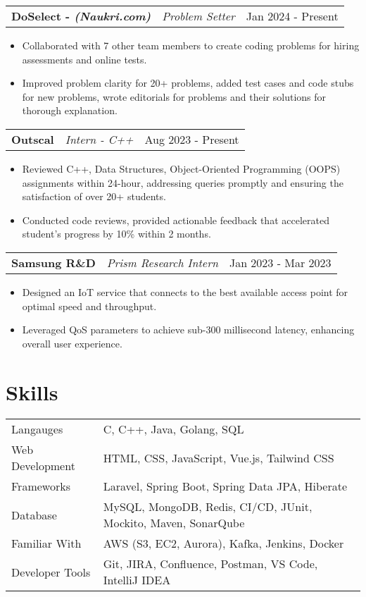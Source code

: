 \documentclass[a4paper,10pt]{article}
\makeatletter
\newenvironment{joblong}[3]
    {
    \begin{tabularx}{\linewidth}{@{}l X r@{}}
    \textbf{#1} & \textit{#2} &  #3 \\[3pt]
    \end{tabularx}
    \begin{minipage}[t]{\linewidth}
    \begin{itemize}[nosep,after=\strut, leftmargin=1em, itemsep=2pt,label=--]
    }
    {
    \end{itemize}
    \end{minipage}    
    }
\makeatother
\begin{document}
\begin{joblong}{DoSelect - {\footnotesize \textit{\textbf{(Naukri.com)}}}}{Problem Setter}{Jan 2024 - Present}
    \item Collaborated with 7 other team members to create coding problems for hiring assessments and online tests.
    \item Improved problem clarity for 20+ problems, added test cases and code stubs for new problems, wrote editorials for
    problems and their solutions for thorough explanation.
\end{joblong}

\begin{joblong}{Outscal}{Intern - C++}{Aug 2023 - Present}
    \item Reviewed C++, Data Structures, Object-Oriented Programming (OOPS) assignments within 24-hour, addressing
    queries promptly and ensuring the satisfaction of over 20+ students.
    \item Conducted code reviews, provided actionable feedback that accelerated student’s progress by 10\% within 2 months.
\end{joblong}

\begin{joblong}{Samsung R\&D}{Prism Research Intern}{Jan 2023 - Mar 2023}
    \item Designed an IoT service that connects to the best available access point for optimal speed and throughput.
    \item Leveraged QoS parameters to achieve sub-300 millisecond latency, enhancing overall user experience.
\end{joblong}
\vspace{-5pt}

\section{Skills}
\vspace{-4pt}
\begin{tabularx}{\linewidth}{@{}l X@{}}
Langauges &  \normalsize{C, C++, Java, Golang, SQL}\\
Web Development & \normalsize{HTML, CSS, JavaScript, Vue.js, Tailwind CSS}\\
Frameworks &  \normalsize{Laravel, Spring Boot, Spring Data JPA, Hiberate}\\
Database & \normalsize{MySQL, MongoDB, Redis, CI/CD, JUnit, Mockito, Maven, SonarQube}\\
Familiar With & \normalsize{AWS (S3, EC2, Aurora), Kafka, Jenkins, Docker}\\
Developer Tools & \normalsize{Git, JIRA, Confluence, Postman, VS Code, IntelliJ IDEA}\\
\end{tabularx}
\end{document}
